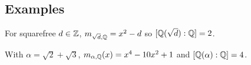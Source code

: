 \subsection{Examples}
\begin{example}
For squarefree $d\in\mathbb{Z}$, $m_{\sqrt d,\mathbb{Q}}=x^2-d$ so $[\mathbb{Q}(\sqrt d):\mathbb{Q}]=2$.
\end{example}
\begin{example}
With $\alpha=\sqrt2+\sqrt3$, $m_{\alpha,\mathbb{Q}}(x)=x^4-10x^2+1$ and $[\mathbb{Q}(\alpha):\mathbb{Q}]=4$.
\end{example}
